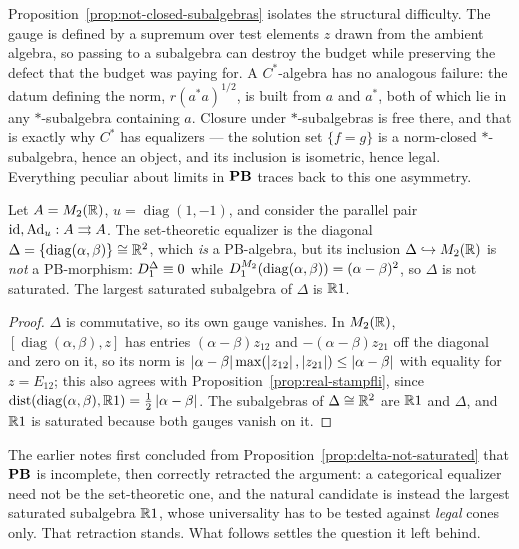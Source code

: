 \begin{remark}\label{rem:ambient-referencing}
Proposition~\ref{prop:not-closed-subalgebras} isolates the structural
difficulty.  The gauge is defined by a supremum over test elements $z$ drawn
from the ambient algebra, so passing to a subalgebra can destroy the budget
while preserving the defect that the budget was paying for.  A $C^*$-algebra
has no analogous failure: the datum defining the norm, $r(a^*a)^{1/2}$, is built
from $a$ and $a^*$, both of which lie in any $*$-subalgebra containing $a$.
Closure under $*$-subalgebras is free there, and that is exactly why $C^*$
has equalizers --- the solution set $\{f=g\}$ is a norm-closed $*$-subalgebra,
hence an object, and its inclusion is isometric, hence legal.  Everything
peculiar about limits in $\mathbf{PB}$ traces back to this one asymmetry.
\end{remark}

\begin{proposition}
\label{prop:delta-not-saturated}
Let $A=M_2(\mathbb{R})$, $u=\operatorname{diag}(1,-1)$, and consider the parallel pair
$\operatorname{id},\operatorname{Ad}_u:A\rightrightarrows A$.  The set-theoretic equalizer is the diagonal
$\Delta=\{\operatorname{diag}(\alpha,\beta)\}\cong\mathbb{R}^2$, which \emph{is} a
PB-algebra, but its inclusion $\Delta\hookrightarrow M_2(\mathbb{R})$ is \emph{not} a
PB-morphism: $D_1^\Delta\equiv0$ while
$D_1^{M_2}(\operatorname{diag}(\alpha,\beta))=(\alpha-\beta)^2$, so
$\Delta$ is not saturated.  The largest saturated subalgebra of $\Delta$ is
$\mathbb{R}1$.
\end{proposition}

\begin{proof}
$\Delta$ is commutative, so its own gauge vanishes.  In $M_2(\mathbb{R})$,
$[\operatorname{diag}(\alpha,\beta),z]$ has entries
$(\alpha-\beta)z_{12}$ and $-(\alpha-\beta)z_{21}$ off the diagonal and zero on
it, so its norm is $\left\lvert\alpha-\beta\right\rvert\max(\left\lvert z_{12}\right\rvert,\left\lvert z_{21}\right\rvert)\le\left\lvert\alpha-\beta\right\rvert$
with equality for $z=E_{12}$; this also agrees with
Proposition~\ref{prop:real-stampfli}, since
$\operatorname{dist}(\operatorname{diag}(\alpha,\beta),\mathbb{R}1)=\tfrac12\left\lvert\alpha-\beta\right\rvert$.  The
subalgebras of $\Delta\cong\mathbb{R}^2$ are $\mathbb{R}1$ and $\Delta$, and $\mathbb{R}1$ is
saturated because both gauges vanish on it.
\end{proof}

\begin{remark}
The earlier notes first concluded from Proposition~\ref{prop:delta-not-saturated}
that $\mathbf{PB}$ is incomplete, then correctly retracted the argument: a categorical
equalizer need not be the set-theoretic one, and the natural candidate is
instead the largest saturated subalgebra $\mathbb{R}1$, whose universality has to be
tested against \emph{legal} cones only.  That retraction stands.  What follows
settles the question it left behind.
\end{remark}

